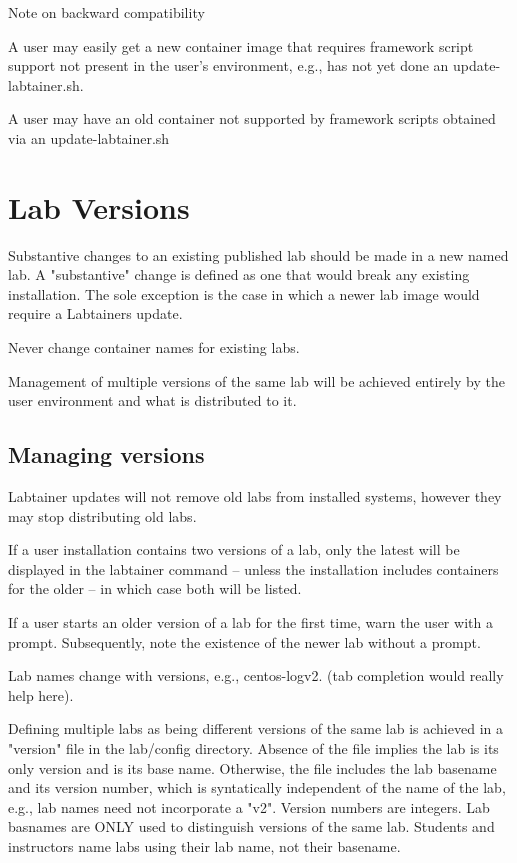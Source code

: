 Note on backward compatibility

A user may easily get a new container image that requires framework
script support not present in the user's environment, e.g., has
not yet done an update-labtainer.sh.  

A user may have an old container not supported by framework scripts
obtained via an update-labtainer.sh

\section{Lab Versions}
Substantive changes to an existing published lab should be made in
a new named lab.  A "substantive" change is defined as one that would
break any existing installation.  The sole exception is the case in 
which a newer lab image would require a Labtainers update.

Never change container names for existing labs.

Management of multiple versions of the same lab will be achieved entirely
by the user environment and what is distributed to it.

\subsection{Managing versions}
Labtainer updates will not remove old labs from installed systems, however 
they may stop distributing old labs.

If a user installation contains two versions of a lab, only the latest will
be displayed in the labtainer command -- unless the installation includes
containers for the older -- in which case both will be listed.

If a user starts an older version of a lab for the first time, warn the user
with a prompt.  Subsequently, note the existence of the newer lab without a prompt.

Lab names change with versions, e.g., centos-logv2.  (tab completion would really
help here).

Defining multiple labs as being different versions of the same lab is achieved
in a "version" file in the lab/config directory.  Absence of the file implies the
lab is its only version and is its base name. Otherwise, the file includes the 
lab basename and its version number, which is syntatically independent of the name
of the lab, e.g., lab names need not incorporate a "v2".  Version numbers are integers.
Lab basnames are ONLY used to distinguish versions of the same lab.   Students and
instructors name labs using their lab name, not their basename.

